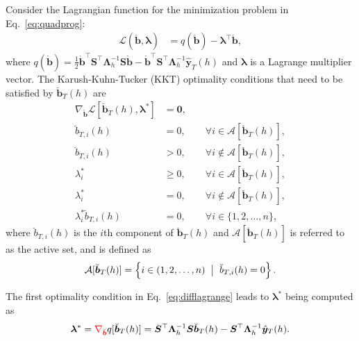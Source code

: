 \documentclass[twocolumn]{svjour3}
\begin{document}
Consider the Lagrangian function for the minimization problem in Eq.~\eqref{eq:quadprog}:
\begin{align*}
\mathcal{L}(\mathring{\bm{b}}, \bm{\lambda}) & = q(\mathring{\bm{b}}) - \bm{\lambda}^\top\mathring{\bm{b}},
\end{align*}
where $q(\mathring{\bm{b}}) = \frac{1}{2}\mathring{\bm{b}}^\top\bm{S}^\top\bm{\Lambda}^{-1}_{h}\bm{S}\mathring{\bm{b}} - \mathring{\bm{b}}^\top\bm{S}^\top\bm{\Lambda}^{-1}_{h}\hat{\bm{y}}_{T}(h)$ and $\bm{\lambda}$ is a Lagrange multiplier vector. The Karush-Kuhn-Tucker (KKT) optimality conditions that need to be satisfied by $\breve{\bm{b}}_{T}(h)$ are
\begin{subequations}
	\label{eq:optcond}
	\begin{align}
	\label{eq:difflagrange}
	\nabla_{\mathring{\bm{b}}} \mathcal{L}[\breve{\bm{b}}_{T}(h), \bm{\lambda}^{*}] & = \bm{0},                                                          \\
	\breve{b}_{T, i}(h)                                                  & = 0, \qquad \forall i \in \mathcal{A}[\breve{\bm{b}}_{T}(h)],      \\
	\breve{b}_{T, i}(h)                                                  & > 0, \qquad \forall i \notin \mathcal{A}[\breve{\bm{b}}_{T}(h)],   \\
	\lambda^{*}_{i}                                                      & \geq 0, \qquad \forall i \in \mathcal{A}[\breve{\bm{b}}_{T}(h)],   \\
	\lambda^{*}_{i}                                                      & = 0, \qquad \forall i \notin \mathcal{A}[\breve{\bm{b}}_{T}(h)],   \\
	\lambda_{i}^{*} \breve{b}_{T, i}(h)                                  & = 0, \qquad \forall i \in \{1, 2, \dots, n\}, \label{eq:kktcomple}
	\end{align}
\end{subequations}
where $\breve{b}_{T, i}(h)$ is the $i$th component of $\breve{\bm{b}}_{T}(h)$ and $\mathcal{A}[\breve{\bm{b}}_{T}(h)]$ is referred to as the active set, and is defined as
\begin{align*}
\mathcal{A}[\breve{\bm{b}}_{T}(h)] = \left\{i \in (1, 2, \dots, n) \hspace*{2mm} \big|\hspace*{2mm} \breve{b}_{T, i}(h) = 0\right\}.
\end{align*}

The first optimality condition in Eq.~\eqref{eq:difflagrange} leads to $\bm{\lambda}^{*}$ being computed as
\begin{align*}
\bm{\lambda}^{*} = {\color{red} \nabla_{\breve{\bm{b}}}} q[\breve{\bm{b}}_{T}(h)] = \bm{S}^\top\bm{\Lambda}^{-1}_{h}\bm{S}\breve{\bm{b}}_{T}(h) - \bm{S}^\top\bm{\Lambda}^{-1}_{h}\hat{\bm{y}}_{T}(h).
\end{align*}
\end{document}
